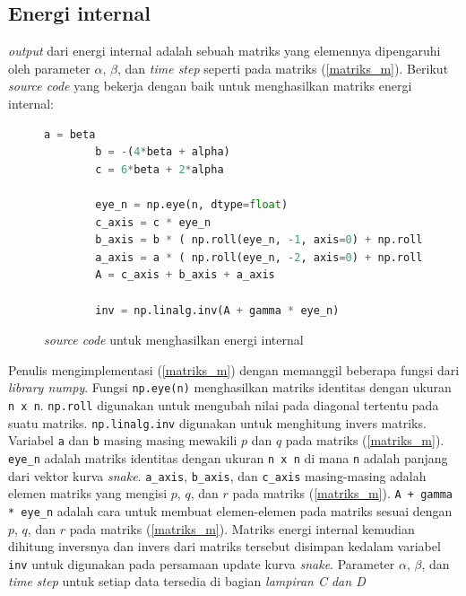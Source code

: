 \subsection{Energi internal}
\emph{output} dari energi internal adalah sebuah matriks yang elemennya dipengaruhi oleh parameter $\alpha$, $\beta$, dan \emph{time step} seperti pada matriks (\ref{matriks_m}). Berikut \emph{source code} yang bekerja dengan baik untuk menghasilkan matriks energi internal:
\begin{figure}[H]
	\begin{lstlisting}[language=Python, basicstyle=\tiny]
		a = beta
		b = -(4*beta + alpha)
		c = 6*beta + 2*alpha
		
		eye_n = np.eye(n, dtype=float)
		c_axis = c * eye_n
		b_axis = b * ( np.roll(eye_n, -1, axis=0) + np.roll(eye_n, -1, axis=1) )
		a_axis = a * ( np.roll(eye_n, -2, axis=0) + np.roll(eye_n, -2, axis=1) )
		A = c_axis + b_axis + a_axis
		
		inv = np.linalg.inv(A + gamma * eye_n)
	\end{lstlisting}
	\caption{\emph{source code} untuk menghasilkan energi internal}
	\label{code:energy_internal}
\end{figure}
Penulis mengimplementasi (\ref{matriks_m}) dengan memanggil beberapa fungsi dari \emph{library numpy}. Fungsi \texttt{np.eye(n)} menghasilkan matriks identitas dengan ukuran \texttt{n x n}. \texttt{np.roll} digunakan untuk mengubah nilai pada diagonal tertentu pada suatu matriks. \texttt{np.linalg.inv} digunakan untuk menghitung invers matriks. Variabel \texttt{a} dan \texttt{b} masing masing mewakili $p$ dan $q$ pada matriks (\ref{matriks_m}). \texttt{eye\_n} adalah matriks identitas dengan ukuran \texttt{n x n} di mana \texttt{n} adalah panjang dari vektor kurva \emph{snake}. \texttt{a\_axis}, \texttt{b\_axis}, dan \texttt{c\_axis} masing-masing adalah elemen matriks yang mengisi $p$, $q$, dan $r$ pada matriks (\ref{matriks_m}). \texttt{A + gamma * eye\_n} adalah cara untuk membuat elemen-elemen pada matriks sesuai dengan $p$, $q$, dan $r$ pada matriks (\ref{matriks_m}). Matriks energi internal kemudian dihitung inversnya dan invers dari matriks tersebut disimpan kedalam variabel \texttt{inv} untuk digunakan pada persamaan update kurva \emph{snake}. Parameter $\alpha$, $\beta$, dan \emph{time step} untuk setiap data tersedia di bagian \emph{lampiran C dan D}

